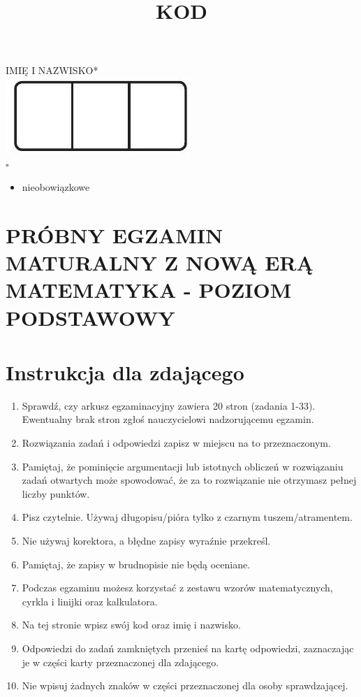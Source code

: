 \documentclass[10pt]{article}
\title{KOD }
\author{}
\date{}
\begin{document}
\maketitle
IMIĘ I NAZWISKO*\\
\includegraphics[max width=\textwidth, center]{2024_11_21_4a1915d79134dda0750eg-01}\\
\(\square\)

\begin{itemize}
  \item nieobowiązkowe
\end{itemize}

\section*{PRÓBNY EGZAMIN MATURALNY Z NOWĄ ERĄ MATEMATYKA - POZIOM PODSTAWOWY}
\section*{Instrukcja dla zdającego}
\begin{enumerate}
  \item Sprawdź, czy arkusz egzaminacyjny zawiera 20 stron (zadania 1-33). Ewentualny brak stron zgłoś nauczycielowi nadzorującemu egzamin.
  \item Rozwiązania zadań i odpowiedzi zapisz w miejscu na to przeznaczonym.
  \item Pamiętaj, że pominięcie argumentacji lub istotnych obliczeń w rozwiązaniu zadań otwartych może spowodować, że za to rozwiązanie nie otrzymasz pełnej liczby punktów.
  \item Pisz czytelnie. Używaj długopisu/pióra tylko z czarnym tuszem/atramentem.
  \item Nie używaj korektora, a błędne zapisy wyraźnie przekreśl.
  \item Pamiętaj, że zapisy w brudnopisie nie będą oceniane.
  \item Podczas egzaminu możesz korzystać z zestawu wzorów matematycznych, cyrkla i linijki oraz kalkulatora.
  \item Na tej stronie wpisz swój kod oraz imię i nazwisko.
  \item Odpowiedzi do zadań zamkniętych przenieś na kartę odpowiedzi, zaznaczając je w części karty przeznaczonej dla zdającego.
  \item Nie wpisuj żadnych znaków w części przeznaczonej dla osoby sprawdzającej.
\end{enumerate}
\end{document}

